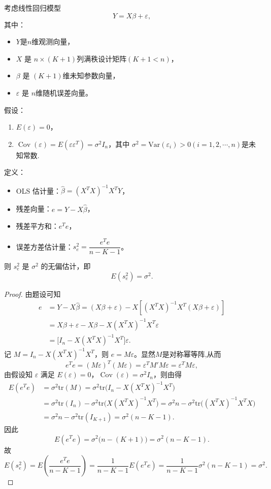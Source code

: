 \documentclass[lang=cn,newtx,10pt,sCheme=Chinese,citestyle=gb7714-2015, bibstyle=gb7714-2015]{../../Template/elegantbook}
\begin{document}
\begin{theorem}[OLS误差方差的无偏估计]
考虑线性回归模型
\[
Y = X\beta + \varepsilon,
\]
其中：
\begin{itemize}
\item $Y$是$n$维观测向量，
\item $X$ 是 $n \times (K+1)$列满秩设计矩阵$(K+1<n)$，
\item $\beta$ 是 $(K+1)$维未知参数向量，
\item $\varepsilon$ 是 $n$维随机误差向量。
\end{itemize}

假设：
\begin{enumerate}[(1)]
\item $E(\varepsilon)=0$，
\item $\operatorname{Cov}(\varepsilon)=E(\varepsilon\varepsilon^T)=\sigma^2 I_n$，其中 $\sigma^2=\text{Var}(\varepsilon_i)>0(i=1,2,\cdots,n)$是未知常数.
\end{enumerate}

定义：
\begin{itemize}
\item OLS 估计量：$\hat{\beta}=(X^TX)^{-1}X^TY$，
\item 残差向量：$e=Y-X\hat{\beta}$，
\item 残差平方和：$e^Te$，
\item 误差方差估计量：$s_e^2=\dfrac{e^Te}{n-K-1}$。
\end{itemize}
则 $s_e^2$ 是 $\sigma^2$ 的无偏估计，即
\[
E(s_e^2)=\sigma^2.
\]
\end{theorem}
\begin{proof}

由题设可知
\[
\begin{aligned}
e &= Y - X\hat{\beta} = (X\beta+\varepsilon) - X[(X^TX)^{-1}X^T(X\beta+\varepsilon)] \\
&= X\beta+\varepsilon - X\beta - X(X^TX)^{-1}X^T\varepsilon \\
&= \bigl[I_n - X(X^TX)^{-1}X^T\bigr]\varepsilon.
\end{aligned}
\]
记 $M = I_n - X(X^TX)^{-1}X^T$，则 $e=M\varepsilon$。显然$M$是对称幂等阵,从而
\[
e^Te = (M\varepsilon)^T(M\varepsilon)=\varepsilon^T M'M \varepsilon = \varepsilon^T M \varepsilon,
\]
由假设知 $\varepsilon$ 满足 $E(\varepsilon)=0$，$\operatorname{Cov}(\varepsilon)=\sigma^2 I_n$，则由得
\begin{align*}
E\left( e^Te \right) &=\sigma ^2\mathrm{tr}\left( M \right) =\sigma ^2\mathrm{tr}\bigl( I_n-X\left( X^TX \right) ^{-1}X^T \bigr) 
\\
&=\sigma ^2\mathrm{tr}\left( I_n \right) -\sigma ^2\mathrm{tr}\bigl( X\left( X^TX \right) ^{-1}X^T \bigr) =\sigma ^2n-\sigma ^2\mathrm{tr}\bigl( \left( X^TX \right) ^{-1}X^TX \bigr) 
\\
&=\sigma ^2n-\sigma ^2\mathrm{tr}\left( I_{K+1} \right) =\sigma ^2\left( n-K-1 \right) .
\end{align*}
因此
\[
E(e^Te)=\sigma^2\bigl(n-(K+1)\bigr)=\sigma^2(n-K-1).
\]
故
\[
E(s_e^2)=E\left(\frac{e^Te}{n-K-1}\right)=\frac{1}{n-K-1}E(e^Te)=\frac{1}{n-K-1}\sigma^2(n-K-1)=\sigma^2.
\]
\end{proof}
\end{document}
